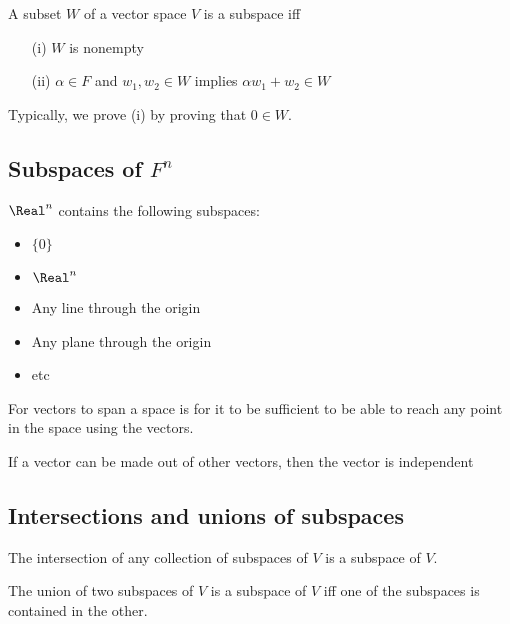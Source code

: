\begin{theorem}
  A subset $W$ of a vector space $V$ is a subspace iff
  \begin{itemize}
    \item[(i)] $W$ is nonempty
    \item[(ii)] $\alpha \in F$ and $w_1, w_2 \in W$ implies $\alpha w_1 + w_2 \in W$
  \end{itemize}

  Typically, we prove (i) by proving that $0 \in W$.
\end{theorem}

\subsection{Subspaces of $F^n$}

\begin{theorem}
  $\Real^n$ contains the following subspaces:
  \begin{itemize}
    \item $\{ 0 \}$
    \item $\Real^n$
    \item Any line through the origin
    \item Any plane through the origin
    \item etc
  \end{itemize}
\end{theorem}

\begin{definition}[Spanning]
  For vectors to span a space is for it to be sufficient to be able to reach any point in the space using the vectors.
\end{definition}

\begin{definition}[Independence]
  If a vector can be made out of other vectors, then the vector is independent
\end{definition}

\subsection{Intersections and unions of subspaces}

\begin{theorem}
  The intersection of any collection of subspaces of $V$ is a subspace of $V$.
\end{theorem}

\begin{theorem}
  The union of two subspaces of $V$ is a subspace of $V$ iff one of the subspaces is contained in the other.
\end{theorem}

